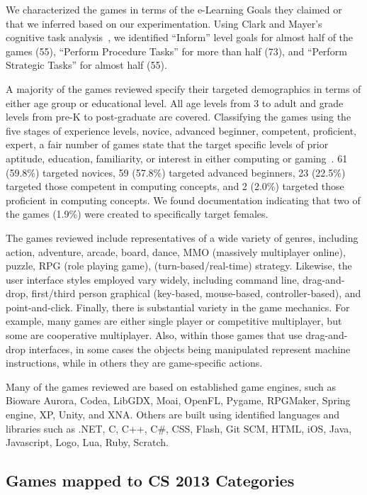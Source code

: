 \documentclass{sig-alternate-05-2015}
\begin{document}
We characterized the games in terms of the e-Learning Goals they claimed or that we inferred based on our experimentation. Using Clark and Mayer's cognitive task analysis~\cite{clark11elearning}, we identified ``Inform'' level goals for almost half of the games (55), ``Perform Procedure Tasks'' for more than half (73), and ``Perform Strategic Tasks'' for almost half (55).



A majority of the games reviewed specify their targeted demographics in terms of either age group or educational level. All age levels from 3 to adult and grade levels from pre-K to post-graduate are covered. Classifying the games using the five stages of experience levels, novice, advanced beginner, competent, proficient, expert, a fair number of games state that the target specific levels of prior aptitude, education, familiarity, or interest in either computing or gaming~\cite{dreyfus86mind}. 61 (59.8\%) targeted novices, 59 (57.8\%) targeted advanced beginners, 23 (22.5\%) targeted those competent in computing concepts, and 2 (2.0\%) targeted those proficient in computing concepts. We found documentation indicating that two of the games (1.9\%) were created to specifically target females. 



The games reviewed include representatives of a wide variety of genres, including action, adventure, arcade, board, dance, MMO (massively multiplayer online), puzzle, RPG (role playing game), (turn-based/real-time) strategy. Likewise, the user interface styles employed vary widely, including command line, drag-and-drop, first/third person graphical (key-based, mouse-based, controller-based), and point-and-click. Finally, there is substantial variety in the game mechanics. For example, many games are either single player or competitive multiplayer, but some are cooperative multiplayer. Also, within those games that use drag-and-drop interfaces, in some cases the objects being manipulated represent machine instructions, while in others they are game-specific actions. 



Many of the games reviewed are based on established game engines, such as Bioware Aurora, Codea, LibGDX, Moai, OpenFL, Pygame, RPGMaker, Spring engine, XP, Unity, and XNA. Others are built using identified languages and libraries such as .NET, C, C++, C\#, CSS, Flash, Git SCM, HTML, iOS, Java, Javascript, Logo, Lua, Ruby, Scratch.\subsection{Games mapped to CS 2013 Categories}
\end{document}
